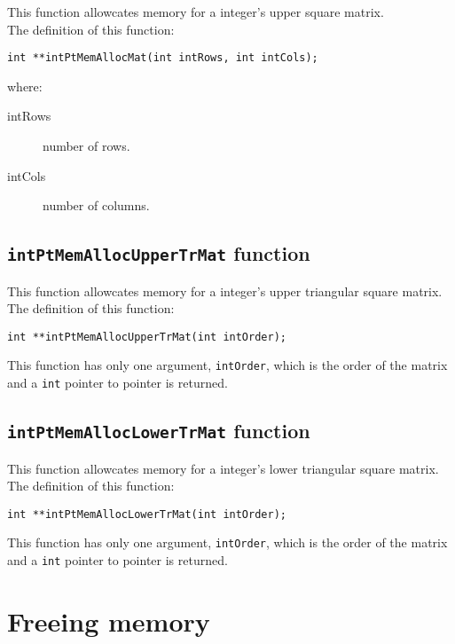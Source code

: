 This function allowcates memory for a integer's upper square matrix.\\

The definition of this function:
%
\begin{verbatim}
int **intPtMemAllocMat(int intRows, int intCols);
\end{verbatim}
where:
%
\begin{description}
\item[intRows] number of rows.
\item[intCols] number of columns.
\end{description}

\subsection{\texttt{intPtMemAllocUpperTrMat} function} \label{sec:intPtMemAllocUpperTrMat}

This function allowcates memory for a integer's upper triangular square matrix.\\

The definition of this function:
%
\begin{verbatim}
int **intPtMemAllocUpperTrMat(int intOrder);
\end{verbatim}

This function has only one argument, \texttt{intOrder}, which is the order of the matrix and a \texttt{int} pointer to pointer is returned.\\

\subsection{\texttt{intPtMemAllocLowerTrMat} function} \label{sec:intPtMemAllocLowerTrMat}

This function allowcates memory for a integer's lower triangular square matrix.\\

The definition of this function:
%
\begin{verbatim}
int **intPtMemAllocLowerTrMat(int intOrder);
\end{verbatim}

This function has only one argument, \texttt{intOrder}, which is the order of the matrix and a \texttt{int} pointer to pointer is returned.\\

\section{Freeing memory} \label{sec:freeingMemory}

